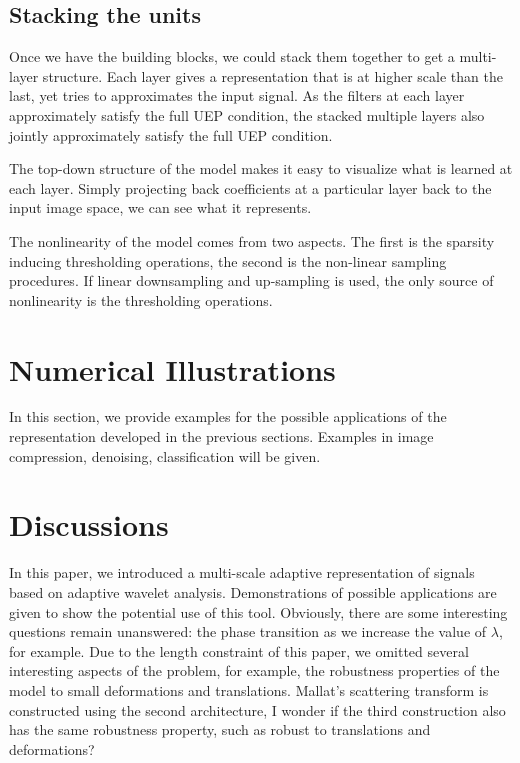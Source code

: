 \documentclass[a4paper]{article}
\begin{document}
\subsection{Stacking the units}
Once we have the building blocks, we could stack them together to get a multi-layer structure. Each layer gives a representation that is at higher scale than the last, yet tries to approximates the input signal. As the filters at each layer approximately satisfy the full UEP condition, the stacked multiple layers also jointly approximately satisfy the full UEP condition. 

 The top-down structure of the model makes it easy to visualize what is learned at each layer. Simply projecting back coefficients at a particular layer back to the input image space, we can see what it represents.

The nonlinearity of the model comes from two aspects. The first is the sparsity inducing thresholding operations, the second is the non-linear sampling procedures. If linear downsampling and up-sampling is used, the only source of nonlinearity is the thresholding operations.



\section{Numerical Illustrations}
In this section, we provide examples for the possible applications of the representation developed in the previous sections. Examples in image compression, denoising, classification will be given. 

\section{Discussions}
In this paper, we introduced a multi-scale adaptive representation of signals based on adaptive wavelet analysis. Demonstrations of possible applications are given to show the potential use of this tool. Obviously, there are some interesting questions remain unanswered: the phase transition as we increase the value of $\lambda$, for example. Due to the length constraint of this paper, we omitted several interesting aspects of the problem, for example, the robustness properties of the model to small deformations and translations.
{\color{red} Mallat's scattering transform is constructed using the second architecture, I wonder if the third construction also has the same robustness property, such as robust to translations and deformations?}
\end{document}
